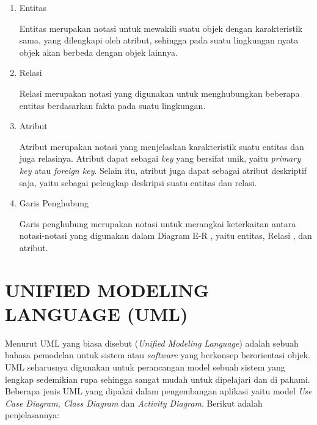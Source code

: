 \begin{enumerate}
	\item Entitas
	\par Entitas merupakan notasi untuk mewakili suatu objek dengan karakteristik sama, yang dilengkapi oleh atribut, sehingga pada suatu lingkungan nyata objek akan berbeda dengan objek lainnya.
	\pagebreak
	\item Relasi
	\par Relasi merupakan notasi yang digunakan untuk menghubungkan beberapa entitas berdasarkan fakta pada suatu lingkungan.
	\item Atribut
	\par Atribut merupakan notasi yang menjelaskan karakteristik suatu entitas dan juga relasinya. Atribut dapat sebagai \textit{key} yang bersifat unik, yaitu \textit{primary key} atau \textit{foreign key}. Selain itu, atribut juga dapat sebagai atribut deskriptif saja, yaitu sebagai pelengkap deskripsi suatu entitas dan relasi.	
	\item Garis Penghubung
	\par Garis penghubung merupakan notasi untuk merangkai keterkaitan antara notasi-notasi yang digunakan dalam Diagram E-R , yaitu entitas, Relasi , dan atribut.
\end{enumerate}

\section{\uppercase{Unified Modeling language (UML)}}
Menurut \citep{nugraha2016perancangan} UML yang biasa disebut (\textit{Unified Modeling Language}) adalah sebuah bahasa pemodelan untuk sistem atau \textit{software} yang berkonsep berorientasi objek. UML seharusnya digunakan untuk perancangan model sebuah sistem yang lengkap sedemikian rupa sehingga sangat mudah untuk dipelajari dan di pahami. Beberapa jenis UML yang dipakai dalam pengembangan aplikasi yaitu model \textit{Use Case Diagram, Class Diagram} dan \textit{Activity Diagram}. Berikut adalah penjelasannya:

